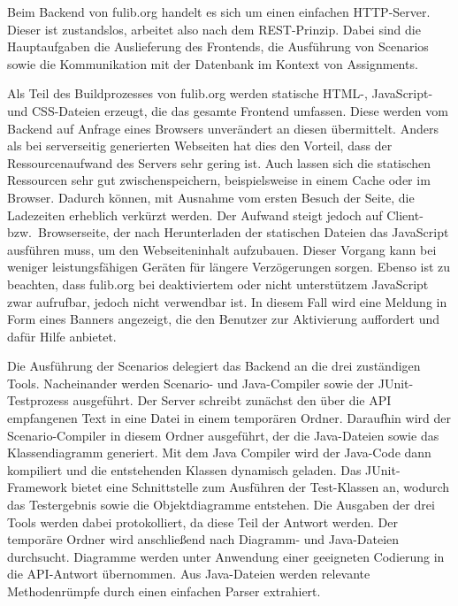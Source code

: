 Beim Backend von fulib.org handelt es sich um einen einfachen HTTP-Server.
Dieser ist zustandslos, arbeitet also nach dem REST-Prinzip.
Dabei sind die Hauptaufgaben die Auslieferung des Frontends, die Ausführung von Scenarios sowie die Kommunikation mit der Datenbank im Kontext von Assignments.

Als Teil des Buildprozesses von fulib.org werden statische HTML-, JavaScript- und CSS-Dateien erzeugt, die das gesamte Frontend umfassen.
Diese werden vom Backend auf Anfrage eines Browsers unverändert an diesen übermittelt.
Anders als bei serverseitig generierten Webseiten hat dies den Vorteil, dass der Ressourcenaufwand des Servers sehr gering ist.
Auch lassen sich die statischen Ressourcen sehr gut zwischenspeichern, beispielsweise in einem Cache oder im Browser.
Dadurch können, mit Ausnahme vom ersten Besuch der Seite, die Ladezeiten erheblich verkürzt werden.
Der Aufwand steigt jedoch auf Client- bzw.\ Browserseite, der nach Herunterladen der statischen Dateien das JavaScript ausführen muss, um den Webseiteninhalt aufzubauen.
Dieser Vorgang kann bei weniger leistungsfähigen Geräten für längere Verzögerungen sorgen.
Ebenso ist zu beachten, dass fulib.org bei deaktiviertem oder nicht unterstützem JavaScript zwar aufrufbar, jedoch nicht verwendbar ist.
In diesem Fall wird eine Meldung in Form eines Banners angezeigt, die den Benutzer zur Aktivierung auffordert und dafür Hilfe anbietet.

Die Ausführung der Scenarios delegiert das Backend an die drei zuständigen Tools.
Nacheinander werden Scenario- und Java-Compiler sowie der JUnit-Testprozess ausgeführt.
Der Server schreibt zunächst den über die API empfangenen Text in eine Datei in einem temporären Ordner.
Daraufhin wird der Scenario-Compiler in diesem Ordner ausgeführt, der die Java-Dateien sowie das Klassendiagramm generiert.
Mit dem Java Compiler wird der Java-Code dann kompiliert und die entstehenden Klassen dynamisch geladen.
Das JUnit-Framework bietet eine Schnittstelle zum Ausführen der Test-Klassen an, wodurch das Testergebnis sowie die Objektdiagramme entstehen.
Die Ausgaben der drei Tools werden dabei protokolliert, da diese Teil der Antwort werden.
Der temporäre Ordner wird anschließend nach Diagramm- und Java-Dateien durchsucht.
Diagramme werden unter Anwendung einer geeigneten Codierung in die API-Antwort übernommen.
Aus Java-Dateien werden relevante Methodenrümpfe durch einen einfachen Parser extrahiert.

